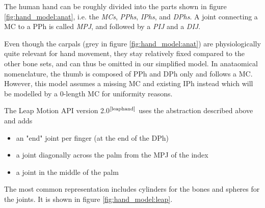 \documentclass[hyperref, bachelorofscience]{cgvpub}
\newcommand{\newcite}[1]{$ ^{\text{\cite{#1}}} $}
\begin{document}
The human hand can be roughly divided into the parts shown in figure \ref{fig:hand_model:anat}, i.e. the \emph{\glspl{MC}}, \emph{\glspl{PPh}}, \emph{\glspl{IPh}}, and \emph{\glspl{DPh}}. A joint connecting a \gls{MC} to a \gls{PPh} is called \emph{\gls{MPJ}}, and followed by a \emph{\gls{PIJ}} and a \emph{\gls{DIJ}}.

Even though the carpals (grey in figure \ref{fig:hand_model:anat}) are physiologically quite relevant for hand movement, they stay relatively fixed compared to the other bone sets, and can thus be omitted in our simplified model. In anataomical nomenclature, the thumb is composed of \gls{PPh} and \gls{DPh} only and follows a \gls{MC}. However, this model assumes a missing \gls{MC} and existing \gls{IPh} instead which will be modelled by a 0-length \gls{MC} for uniformity reasons.

The Leap Motion API version 2.0\newcite{leaphand} uses the abstraction described above and adds
\vspace{.3cm}
\begin{itemize}
	\item an "end" joint per finger (at the end of the \gls{DPh})
	\item a joint diagonally across the palm from the \gls{MPJ} of the index
	\item a joint in the middle of the palm
\end{itemize}

The most common representation includes cylinders for the bones and spheres for the joints. It is shown in figure \ref{fig:hand_model:leap}.
\end{document}
